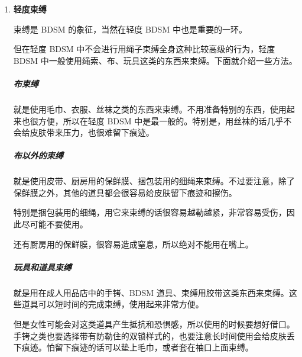 \documentclass[12pt,UTF8]{ctexbook}
\begin{document}
\begin{enumerate}
普通的安睡眼罩在商店里100日元（≈7.5RMB）就可以买到。买不到的话，也可以使用毛巾或者衣物代替。性爱旅馆中也常备有一次性的眼罩使用。

\subparagraph{遮住眼睛后的玩法}

主要分成两种方式，一种是遮住眼睛不知道对方会对自己做什么而感到兴奋的方式，一种是遮住眼睛不知道对方会让自己会做什么而感到兴奋的方式。

对于前者来说的感觉就是，什么都看不见的时候身体忽然被碰到，或者忽然被爱抚预想不到的地方，或者忽然用性玩具开始爱抚，或者听到性玩具振动的声音，但是自己又不知道接下来要爱抚何处。这种不知道接下来要发生什么的感觉会让人非常兴奋。尽可能给对方做出意想不到的爱抚。

对于后者来说，就是在看不见的情况下被要求做各式各样的侍奉行为。比如忽然将阴茎凑到面前，要求口交，或者忽然将双腿打开。像这样不知道自己在做什么，也不知道对方要让自己做什么，让对方通过语言来指导接下来做什么的这种状态可以给人很高的兴奋感。

在遮住眼睛的时候，由于看不见，所以要注意不要受伤。在陌生的性爱旅馆和熟悉的自己的屋子中，都有撞到身体和从床上滚到地上去的可能。所以S不要让M离开自己的视线，不要让M受伤。

	\item \textbf{轻度束缚}

束缚是 BDSM 的象征，当然在轻度 BDSM 中也是重要的一环。

但在轻度 BDSM 中不会进行用绳子束缚全身这种比较高级的行为，轻度 BDSM 中一般使用绳索、布、玩具这类的东西来束缚。下面就介绍一些方法。

\subparagraph{布束缚}

就是使用毛巾、衣服、丝袜之类的东西来束缚。不用准备特别的东西，使用起来也很方便，所以在轻度 BDSM 中是最一般的。特别是，用丝袜的话几乎不会给皮肤带来压力，也很难留下痕迹。

\subparagraph{布以外的束缚}

就是使用皮带、厨房用的保鲜膜、捆包装用的细绳来束缚。不过要注意，除了保鲜膜之外，其他的道具都会很容易给皮肤留下痕迹和擦伤。

特别是捆包装用的细绳，用它来束缚的话很容易越勒越紧，非常容易受伤，因此尽可能不要使用。

还有厨房用的保鲜膜，很容易造成窒息，所以绝对不能用在嘴上。

\subparagraph{玩具和道具束缚}

就是用在成人用品店中的手铐、BDSM 道具、束缚用胶带这类东西来束缚。这些道具可以短时间的完成束缚，使用起来非常方便。

但是女性可能会对这类道具产生抵抗和恐惧感，所以使用的时候要想好借口。手铐之类也要选择带有防勒住的双锁样式的，也要注意长时间使用会给皮肤丢下痕迹。怕留下痕迹的话可以垫上毛巾，或者套在袖口上面束缚。


\end{enumerate}
\end{document}
